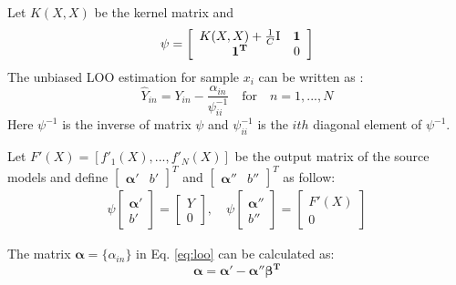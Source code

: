 Let $K(X,X)$ be the kernel matrix and
\begin{equation}\label{eq:linear}
\psi=\left[ {\begin{array}{*{20}{c}}
{K(X,X) + \frac{1}{C}{\rm{I}}}&\mathbf{1}\\
\mathbf{1^T}&0
\end{array}} \right]
\end{equation}
The unbiased LOO estimation for sample $x_i$ can be written as \cite{cawley2006leave}:
\begin{equation} \label{eq:loo}
{\hat Y_{in}} = {Y_{in}} - \frac{{{\alpha _{in}}}}{{\psi_{ii}^{ - 1}}}\quad {\text{for}}\quad n = 1,...,N
\end{equation}
Here $\psi^{-1}$ is the inverse of matrix $\psi$ and  $\psi_{ii}^{-1}$ is the $ith$ diagonal element of $\psi^{-1}$. 

Let $F'(X)=\left[f'_1(X),...,f'_N(X)\right]$ be the output matrix of the source models and define $\left[\begin{array}{cc}\boldsymbol{\alpha'} & b'\end{array}\right]^T$ and $\left[\begin{array}{cc}\boldsymbol{\alpha}''& b''\end{array}\right]^T$ as follow:
\begin{equation}
\begin{array}{c}
 {\psi}\left[ {\begin{array}{*{20}{c}}
{\boldsymbol{\alpha} '}\\
{b'}
\end{array}} \right] = \left[ {\begin{array}{*{20}{c}}
Y\\
0
\end{array}} \right], \quad
{\psi}\left[ {\begin{array}{*{20}{c}}
{\boldsymbol{\alpha} ''}\\
{b''}
\end{array}} \right] = \left[ {\begin{array}{*{20}{c}}
{F'(X)}\\
0
\end{array}} \right]
\end{array}
\end{equation}

The matrix $\boldsymbol{\alpha}=\{\alpha_{in}\}$ in Eq. \eqref{eq:loo} can be calculated as:
\begin{equation}\label{eq:solution}
 \boldsymbol{\alpha}  = \boldsymbol{\alpha} ' - \boldsymbol{\alpha} ''\boldsymbol{\beta ^T}
\end{equation}

